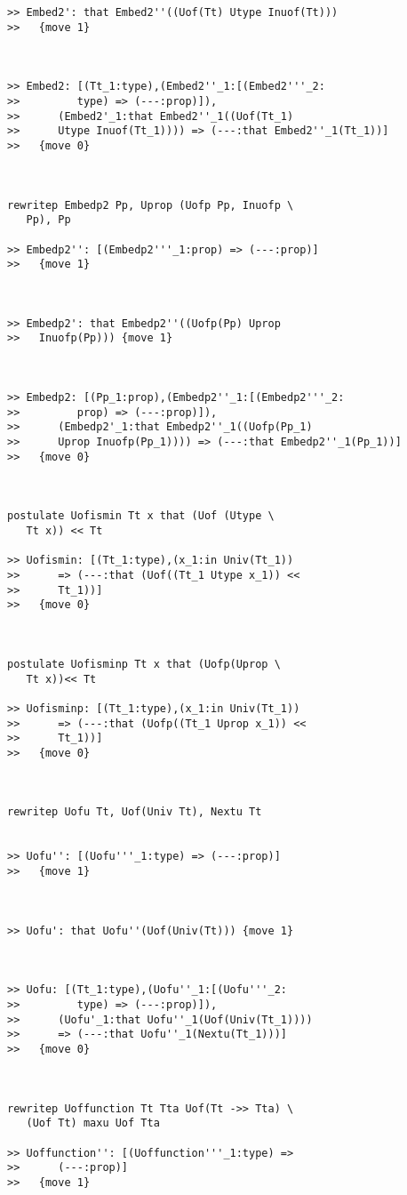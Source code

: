 \documentclass{article}
\begin{document}
\begin{verbatim}
>> Embed2': that Embed2''((Uof(Tt) Utype Inuof(Tt)))
>>   {move 1}



>> Embed2: [(Tt_1:type),(Embed2''_1:[(Embed2'''_2:
>>         type) => (---:prop)]),
>>      (Embed2'_1:that Embed2''_1((Uof(Tt_1)
>>      Utype Inuof(Tt_1)))) => (---:that Embed2''_1(Tt_1))]
>>   {move 0}



rewritep Embedp2 Pp, Uprop (Uofp Pp, Inuofp \
   Pp), Pp

>> Embedp2'': [(Embedp2'''_1:prop) => (---:prop)]
>>   {move 1}



>> Embedp2': that Embedp2''((Uofp(Pp) Uprop
>>   Inuofp(Pp))) {move 1}



>> Embedp2: [(Pp_1:prop),(Embedp2''_1:[(Embedp2'''_2:
>>         prop) => (---:prop)]),
>>      (Embedp2'_1:that Embedp2''_1((Uofp(Pp_1)
>>      Uprop Inuofp(Pp_1)))) => (---:that Embedp2''_1(Pp_1))]
>>   {move 0}



postulate Uofismin Tt x that (Uof (Utype \
   Tt x)) << Tt

>> Uofismin: [(Tt_1:type),(x_1:in Univ(Tt_1))
>>      => (---:that (Uof((Tt_1 Utype x_1)) <<
>>      Tt_1))]
>>   {move 0}



postulate Uofisminp Tt x that (Uofp(Uprop \
   Tt x))<< Tt

>> Uofisminp: [(Tt_1:type),(x_1:in Univ(Tt_1))
>>      => (---:that (Uofp((Tt_1 Uprop x_1)) <<
>>      Tt_1))]
>>   {move 0}



rewritep Uofu Tt, Uof(Univ Tt), Nextu Tt


>> Uofu'': [(Uofu'''_1:type) => (---:prop)]
>>   {move 1}



>> Uofu': that Uofu''(Uof(Univ(Tt))) {move 1}



>> Uofu: [(Tt_1:type),(Uofu''_1:[(Uofu'''_2:
>>         type) => (---:prop)]),
>>      (Uofu'_1:that Uofu''_1(Uof(Univ(Tt_1))))
>>      => (---:that Uofu''_1(Nextu(Tt_1)))]
>>   {move 0}



rewritep Uoffunction Tt Tta Uof(Tt ->> Tta) \
   (Uof Tt) maxu Uof Tta

>> Uoffunction'': [(Uoffunction'''_1:type) =>
>>      (---:prop)]
>>   {move 1}




\end{verbatim}
\end{document}
